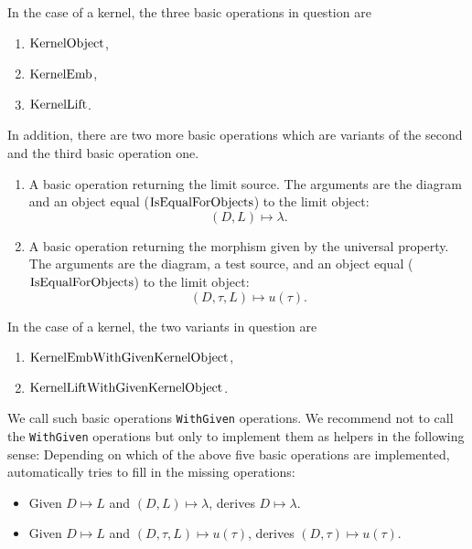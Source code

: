 \begin{example}
 In the case of a kernel, the three basic operations in question are
 \begin{enumerate}
  \item $\mathrm{KernelObject}$,
  \item $\mathrm{KernelEmb}$,
  \item $\mathrm{KernelLift}$.
 \end{enumerate} 
\end{example}

In addition, there are two more basic operations which are variants of the second
and the third basic operation one.

\begin{enumerate}
 \item A basic operation returning the limit source. The arguments are the diagram
       and an object equal ($\mathrm{IsEqualForObjects}$) to the limit object:
       \[
        ( D, L ) \mapsto \lambda.
       \]
  \item A basic operation returning the morphism given by the universal property.
        The arguments are the diagram, a test source, and an object equal ($\mathrm{IsEqualForObjects}$)
        to the limit object:
        \[
         ( D, \tau, L ) \mapsto u( \tau ).
        \]
\end{enumerate}

\begin{example}
 In the case of a kernel, the two variants in question are
 \begin{enumerate}
  \item $\mathrm{KernelEmbWithGivenKernelObject}$,
  \item $\mathrm{KernelLiftWithGivenKernelObject}$.
 \end{enumerate} 
\end{example}

We call such basic operations \texttt{WithGiven} operations.
We recommend not to call the \texttt{WithGiven} operations but only to implement them
as helpers in the following sense:
Depending on which of the above five basic operations are implemented, \CapPkg
automatically tries to fill in the missing operations:

\begin{itemize}
 \item Given $D \mapsto L$ and $( D, L ) \mapsto \lambda$, \CapPkg derives $D \mapsto \lambda$.
 \item Given $D \mapsto L$ and $( D, \tau, L ) \mapsto u( \tau )$, \CapPkg derives $( D, \tau ) \mapsto u(\tau)$.
\end{itemize}

